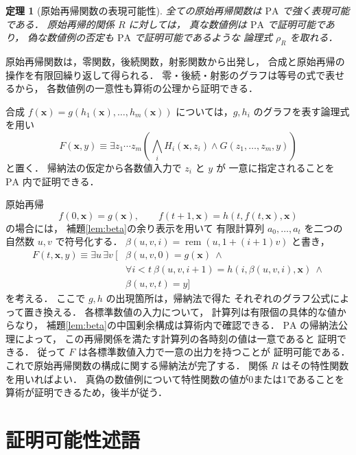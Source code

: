 \documentclass[a5paper,10pt,onecolumn]{jsarticle}
\makeatletter
\theoremstyle{mathnotetheorem}
\newtheorem{theorem}{定理}[section]
\renewcommand{\proofname}{証明}
\renewenvironment{proof}[1][\proofname]{%
  \par\pushQED{\qed}\normalfont\topsep4\p@\@plus2\p@\relax
  \trivlist\item[\hskip\labelsep\bfseries #1]\ignorespaces
}{\popQED\endtrivlist\@endpefalse}
\makeatother
\begin{document}
\begin{theorem}[原始再帰関数の表現可能性]
\label{thm:representability}
全ての原始再帰関数は $\mathrm{PA}$ で強く表現可能である．
原始再帰的関係 $R$ に対しては，
真な数値例は $\mathrm{PA}$ で証明可能であり，
偽な数値例の否定も $\mathrm{PA}$ で証明可能であるような
論理式 $\rho_R$ を取れる．
\end{theorem}
\begin{proof}
原始再帰関数は，零関数，後続関数，射影関数から出発し，
合成と原始再帰の操作を有限回繰り返して得られる．
零・後続・射影のグラフは等号の式で表せるから，
各数値例の一意性も算術の公理から証明できる．

合成 $f(\boldsymbol x)
 =g(h_1(\boldsymbol x),\dots,h_m(\boldsymbol x))$
については，$g,h_i$ のグラフを表す論理式を用い
\[
 F(\boldsymbol x,y)\equiv
 \exists z_1\cdots z_m
 \left(\bigwedge_iH_i(\boldsymbol x,z_i)
 \land G(z_1,\dots,z_m,y)\right)
\]
と置く．
帰納法の仮定から各数値入力で $z_i$ と $y$ が
一意に指定されることを $\mathrm{PA}$ 内で証明できる．

原始再帰
\[
 f(0,\boldsymbol x)=g(\boldsymbol x),\qquad
 f(t+1,\boldsymbol x)
 =h(t,f(t,\boldsymbol x),\boldsymbol x)
\]
の場合には，
補題\ref{lem:beta}の余り表示を用いて
有限計算列
$a_0,\dots,a_t$ を二つの自然数 $u,v$ で符号化する．
$\beta(u,v,i)=\operatorname{rem}(u,1+(i+1)v)$ と書き，
\[
 \begin{aligned}
 F(t,\boldsymbol x,y)\equiv
 \exists u\,\exists v\ \bigl[&
 \beta(u,v,0)=g(\boldsymbol x)\ \land\\
 &\forall i<t\ 
 \beta(u,v,i+1)
 =h(i,\beta(u,v,i),\boldsymbol x)\ \land\\
 &\beta(u,v,t)=y\bigr]
 \end{aligned}
\]
を考える．
ここで $g,h$ の出現箇所は，帰納法で得た
それぞれのグラフ公式によって置き換える．
各標準数値の入力について，
計算列は有限個の具体的な値からなり，
補題\ref{lem:beta}の中国剰余構成は算術内で確認できる．
$\mathrm{PA}$ の帰納法公理によって，
この再帰関係を満たす計算列の各時刻の値は一意であると
証明できる．
従って $F$ は各標準数値入力で一意の出力を持つことが
証明可能である．
これで原始再帰関数の構成に関する帰納法が完了する．
関係 $R$ はその特性関数を用いればよい．
真偽の数値例について特性関数の値が0または1であることを
算術が証明できるため，後半が従う．
\end{proof}

\section{証明可能性述語}
\end{document}
